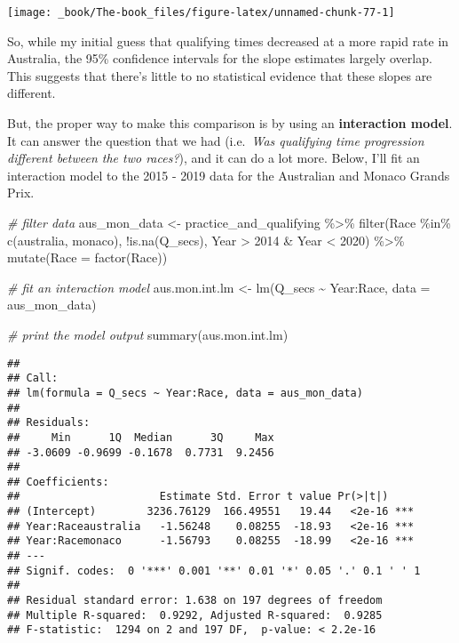 \documentclass[
]{book}
\newenvironment{Shaded}{\begin{snugshade}}{\end{snugshade}}
\newcommand{\AttributeTok}[1]{\textcolor[rgb]{0.77,0.63,0.00}{#1}}
\newcommand{\CommentTok}[1]{\textcolor[rgb]{0.56,0.35,0.01}{\textit{#1}}}
\newcommand{\DecValTok}[1]{\textcolor[rgb]{0.00,0.00,0.81}{#1}}
\newcommand{\FunctionTok}[1]{\textcolor[rgb]{0.00,0.00,0.00}{#1}}
\newcommand{\NormalTok}[1]{#1}
\newcommand{\OtherTok}[1]{\textcolor[rgb]{0.56,0.35,0.01}{#1}}
\newcommand{\SpecialCharTok}[1]{\textcolor[rgb]{0.00,0.00,0.00}{#1}}
\newcommand{\StringTok}[1]{\textcolor[rgb]{0.31,0.60,0.02}{#1}}
\begin{document}
\begin{center}\texttt{[image: \_book/The-book\_files/figure-latex/unnamed-chunk-77-1]} \end{center}

So, while my initial guess that qualifying times decreased at a more rapid rate in Australia, the 95\% confidence intervals for the slope estimates largely overlap. This suggests that there's little to no statistical evidence that these slopes are different.

But, the proper way to make this comparison is by using an \textbf{interaction model}. It can answer the question that we had (i.e.~\emph{Was qualifying time progression different between the two races?}), and it can do a lot more. Below, I'll fit an interaction model to the 2015 - 2019 data for the Australian and Monaco Grands Prix.

\begin{Shaded}
\begin{Highlighting}[]
\CommentTok{\# filter data}
\NormalTok{aus\_mon\_data }\OtherTok{\textless{}{-}}\NormalTok{ practice\_and\_qualifying }\SpecialCharTok{\%\textgreater{}\%}
  \FunctionTok{filter}\NormalTok{(Race }\SpecialCharTok{\%in\%} \FunctionTok{c}\NormalTok{(}\StringTok{\textquotesingle{}australia\textquotesingle{}}\NormalTok{, }\StringTok{\textquotesingle{}monaco\textquotesingle{}}\NormalTok{),}
         \SpecialCharTok{!}\FunctionTok{is.na}\NormalTok{(Q\_secs),}
\NormalTok{         Year }\SpecialCharTok{\textgreater{}} \DecValTok{2014} \SpecialCharTok{\&}\NormalTok{ Year }\SpecialCharTok{\textless{}} \DecValTok{2020}\NormalTok{) }\SpecialCharTok{\%\textgreater{}\%}
  \FunctionTok{mutate}\NormalTok{(}\AttributeTok{Race =} \FunctionTok{factor}\NormalTok{(Race))}

\CommentTok{\# fit an interaction model}
\NormalTok{aus.mon.int.lm }\OtherTok{\textless{}{-}} \FunctionTok{lm}\NormalTok{(Q\_secs }\SpecialCharTok{\textasciitilde{}}\NormalTok{ Year}\SpecialCharTok{:}\NormalTok{Race, }\AttributeTok{data =}\NormalTok{ aus\_mon\_data)}

\CommentTok{\# print the model output}
\FunctionTok{summary}\NormalTok{(aus.mon.int.lm)}
\end{Highlighting}
\end{Shaded}

\begin{verbatim}
## 
## Call:
## lm(formula = Q_secs ~ Year:Race, data = aus_mon_data)
## 
## Residuals:
##     Min      1Q  Median      3Q     Max 
## -3.0609 -0.9699 -0.1678  0.7731  9.2456 
## 
## Coefficients:
##                      Estimate Std. Error t value Pr(>|t|)    
## (Intercept)        3236.76129  166.49551   19.44   <2e-16 ***
## Year:Raceaustralia   -1.56248    0.08255  -18.93   <2e-16 ***
## Year:Racemonaco      -1.56793    0.08255  -18.99   <2e-16 ***
## ---
## Signif. codes:  0 '***' 0.001 '**' 0.01 '*' 0.05 '.' 0.1 ' ' 1
## 
## Residual standard error: 1.638 on 197 degrees of freedom
## Multiple R-squared:  0.9292, Adjusted R-squared:  0.9285 
## F-statistic:  1294 on 2 and 197 DF,  p-value: < 2.2e-16
\end{verbatim}
\end{document}
